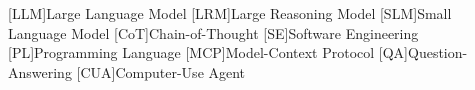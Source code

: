 \begin{acronym}
[LLM]{Large Language Model}
[LRM]{Large Reasoning Model}
[SLM]{Small Language Model}
[CoT]{Chain-of-Thought}
[SE]{Software Engineering}
[PL]{Programming Language}
[MCP]{Model-Context Protocol}
[QA]{Question-Answering}
[CUA]{Computer-Use Agent}
\end{acronym}